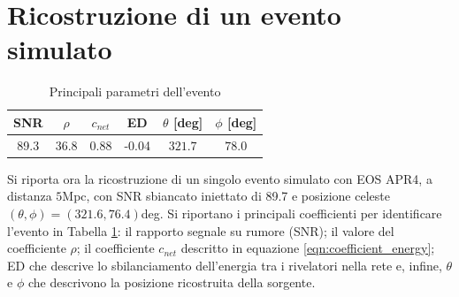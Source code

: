 \section{Ricostruzione di un evento simulato}
\label{subsection:APR4}
\begin{table}
	\begin{tabular}{cccccc}
		\toprule
		SNR	&$\rho$	&$c_{net}$	&ED	&$\theta$ [deg]	&$\phi$ [deg]	\\
		\midrule
		89.3	&36.8	&0.88	&-0.04	&$321.7$	&$78.0$	\\
		\bottomrule
	\end{tabular}
	\caption{Principali parametri dell'evento}
	\label{tab:parametri}
\end{table}
Si riporta ora la ricostruzione di un singolo evento simulato con EOS APR4, a distanza $5$Mpc, con SNR sbiancato iniettato di 89.7 e posizione celeste $(\theta,\phi)=(321.6, 76.4)$deg.
Si riportano i principali coefficienti per identificare l'evento in Tabella \ref{tab:parametri}: il rapporto segnale su rumore (SNR); il valore del coefficiente $\rho$; il coefficiente $c_{net}$ descritto in equazione \ref{eqn:coefficient_energy}; ED che descrive lo sbilanciamento dell'energia tra i rivelatori nella rete e, infine, $\theta$ e $\phi$ che descrivono la posizione ricostruita della sorgente.
